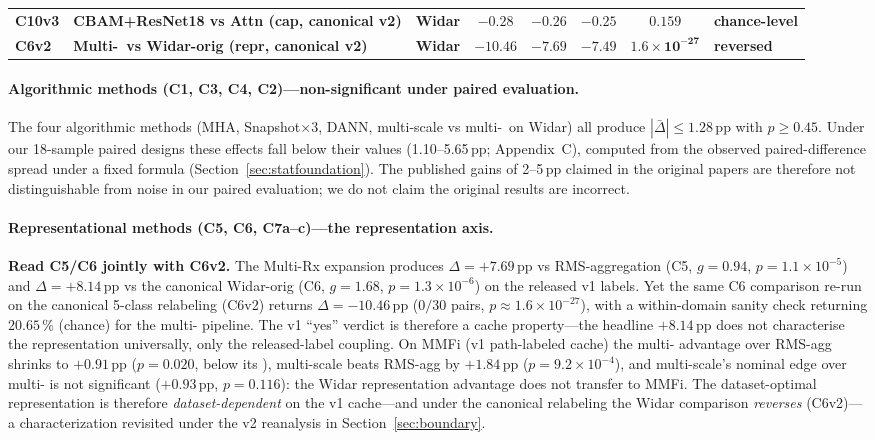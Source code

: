 \documentclass[11pt]{article}
\theoremstyle{definition}
\newcommand{\MDE}{\text{MDE}}
\newcommand{\Rx}{\text{Rx}}
\newcommand{\MultiRx}{Multi-Rx}
\begin{document}
\begin{table}[!t]
\begin{tabular}{@{}l >{\raggedright\arraybackslash}p{3.6cm} l c c c c >{\raggedright\arraybackslash}p{1.5cm}@{}}
    \textbf{C10v3} & \textbf{CBAM+ResNet18 vs Attn (cap, canonical v2)} & \textbf{Widar} & $\mathbf{-0.28}$ & $\mathbf{-0.26}$ & $\mathbf{-0.25}$ & $\mathbf{0.159}$ & \textbf{chance-level} \\
    \textbf{C6v2} & \textbf{Multi-\Rx\ vs Widar-orig (repr, canonical v2)} & \textbf{Widar} & $\mathbf{-10.46}$ & $\mathbf{-7.69}$ & $\mathbf{-7.49}$ & $\mathbf{1.6\!\times\!10^{-27}}$ & \textbf{reversed} \\
    \bottomrule
    \end{tabular}
\end{table}

\paragraph{Algorithmic methods (C1, C3, C4, C2)---non-significant under paired evaluation.}
The four algorithmic methods (MHA, Snapshot$\times$3, DANN, multi-scale vs multi-\Rx\ on Widar) all produce $|\bar{\Delta}| \leq 1.28$\,pp with $p \geq 0.45$. Under our 18-sample paired designs these effects fall below their \MDE{} values (1.10--5.65\,pp; Appendix~C), computed from the observed paired-difference spread under a fixed formula (Section~\ref{sec:statfoundation}). The published gains of 2--5\,pp claimed in the original papers are therefore not distinguishable from noise in our paired evaluation; we do not claim the original results are incorrect.

\paragraph{Representational methods (C5, C6, C7a--c)---the representation axis.}
\textbf{Read C5/C6 jointly with C6v2.} The \MultiRx{} expansion produces $\Delta = +7.69$\,pp vs RMS-aggregation (C5, $g = 0.94$, $p = 1.1 \times 10^{-5}$) and $\Delta = +8.14$\,pp vs the canonical Widar-orig (C6, $g = 1.68$, $p = 1.3 \times 10^{-6}$) on the released v1 labels. Yet the same C6 comparison re-run on the canonical 5-class relabeling (C6v2) returns $\Delta = -10.46$\,pp ($0/30$ pairs, $p \approx 1.6\times10^{-27}$), with a within-domain sanity check returning $20.65\,\%$ (chance) for the multi-\Rx{} pipeline. The v1 ``yes'' verdict is therefore a cache property---the headline $+8.14$\,pp does not characterise the representation universally, only the released-label coupling. On MMFi (v1 path-labeled cache) the multi-\Rx{} advantage over RMS-agg shrinks to $+0.91$\,pp ($p = 0.020$, below its \MDE), multi-scale beats RMS-agg by $+1.84$\,pp ($p = 9.2 \times 10^{-4}$), and multi-scale's nominal edge over multi-\Rx{} is not significant ($+0.93$\,pp, $p = 0.116$): the Widar representation advantage does not transfer to MMFi. The dataset-optimal representation is therefore \emph{dataset-dependent} on the v1 cache---and under the canonical relabeling the Widar comparison \emph{reverses} (C6v2)---a characterization revisited under the v2 reanalysis in Section~\ref{sec:boundary}.
\end{document}
